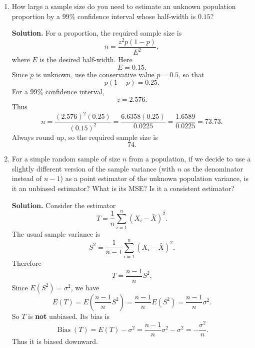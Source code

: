 \documentclass[12pt]{article}
\begin{document}
\begin{enumerate}[label=(\arabic*), leftmargin=*]
\par\medskip
\noindent\textbf{Solution.}
Let $p$ be the true support proportion. We test
\[
H_0:p\le 0.55
\qquad\text{versus}\qquad
H_1:p>0.55.
\]
The sample proportion is
\[
\hat p=\frac{685}{1225}=0.5592.
\]
Under $H_0$, the standard error is
\[
SE=\sqrt{\frac{(0.55)(0.45)}{1225}}=\sqrt{0.00020204}\approx 0.01421.
\]
The test statistic is
\[
z=\frac{\hat p-p_0}{SE}
=\frac{0.5592-0.55}{0.01421}
\approx 0.646.
\]
For a right-tailed test at $\alpha=0.02$, the critical value is
\[
z_{0.98}\approx 2.054.
\]
Since
\[
0.646<2.054,
\]
we do not reject $H_0$.
The p-value is
\[
P(Z>0.646)\approx 0.2591.
\]
So the claim that support exceeds $55\%$ is not believable at the $2\%$ significance level.

\item How large a sample size do you need to estimate an unknown population proportion by a $99\%$ confidence interval whose half-width is $0.15$?

\par\medskip
\noindent\textbf{Solution.}
For a proportion, the required sample size is
\[
n=\frac{z^2p(1-p)}{E^2},
\]
where $E$ is the desired half-width. Here
\[
E=0.15.
\]
Since $p$ is unknown, use the conservative value $p=0.5$, so that
\[
p(1-p)=0.25.
\]
For a $99\%$ confidence interval,
\[
z=2.576.
\]
Thus
\[
n=\frac{(2.576)^2(0.25)}{(0.15)^2}
=\frac{6.6358(0.25)}{0.0225}
=\frac{1.6589}{0.0225}
=73.73.
\]
Always round up, so the required sample size is
\[
\boxed{74}.
\]

\item For a simple random sample of size $n$ from a population, if we decide to use a slightly different version of the sample variance (with $n$ as the denominator instead of $n-1$) as a point estimator of the unknown population variance, is it an unbiased estimator? What is its MSE? Is it a consistent estimator?

\par\medskip
\noindent\textbf{Solution.}
Consider the estimator
\[
T=\frac{1}{n}\sum_{i=1}^n (X_i-\bar X)^2.
\]
The usual sample variance is
\[
S^2=\frac{1}{n-1}\sum_{i=1}^n (X_i-\bar X)^2.
\]
Therefore
\[
T=\frac{n-1}{n}S^2.
\]
Since $E(S^2)=\sigma^2$, we have
\[
E(T)=E\left(\frac{n-1}{n}S^2\right)=\frac{n-1}{n}E(S^2)=\frac{n-1}{n}\sigma^2.
\]
So $T$ is \textbf{not} unbiased. Its bias is
\[
\operatorname{Bias}(T)=E(T)-\sigma^2=\frac{n-1}{n}\sigma^2-\sigma^2=-\frac{\sigma^2}{n}.
\]
Thus it is biased downward.


\end{enumerate}
\end{document}
